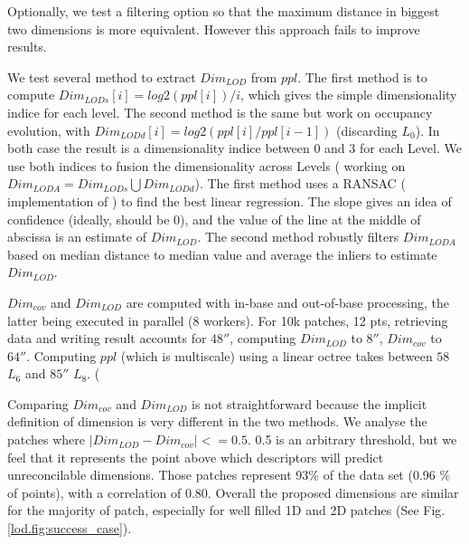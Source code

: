 		Optionally, we test a filtering option so that the maximum distance in biggest two dimensions is more equivalent. However this approach fails to improve results.
		
		We test several method to extract $Dim_{LOD}$ from $ppl$.
		The first method is to compute $ Dim_{LODs}[i] = log2(ppl[i])/i$,
		which gives the simple dimensionality indice for each level.
		The second method is the same but work on occupancy evolution, with
		$Dim_{LODd}[i] = log2(ppl[i]/ppl[i-1])$ (discarding $L_0$).
		In both case the result is a dimensionality indice between 0 and 3 for each Level.
		We use both indices to fusion the dimensionality across Levels (  working on $Dim_{LODA} = Dim_{LODs}\bigcup Dim_{LODd}$).
		The first method uses a RANSAC (\cite{SciPy2014} implementation of \cite{Choi2009}) 
		to find the best linear regression. The slope gives an idea of confidence (ideally, should be 0),
		and the value of the line at the middle of abscissa is an estimate of $Dim_{LOD}$.
		The second method robustly filters $Dim_{LODA}$ based on median distance to median value and
		average the inliers to estimate $Dim_{LOD}$.
		
		$Dim_{cov}$ and $Dim_{LOD}$ are computed with in-base and out-of-base processing, the latter 
		being executed in parallel (8 workers).
		For 10k patches, 12 \mega pts, retrieving data and writing result accounts for $48\second$, computing $Dim_{LOD}$ to $8\second$, $Dim_{cov}$ to $64\second$. Computing $ppl$ (which is multiscale) using a linear octree takes between $58$ $L_6$ and $85 \second$ $L_8$.
		 (
		
		
		Comparing $Dim_{cov}$ and $Dim_{LOD}$ is not straightforward because the implicit definition of dimension is very different in the two methods.
		We analyse the patches where $\lvert Dim_{LOD} -  Dim_{cov}\rvert <=0.5$. 
		0.5 is an arbitrary threshold,
		but we feel that it represents the point above which descriptors will predict unreconcilable dimensions.
		Those patches represent 93\% of the data set (0.96 \% of points), with a correlation of 0.80.
		Overall the proposed dimensions are similar for the majority of patch, especially for well filled 1D and 2D patches (See Fig. \ref{lod.fig:success_case}).
		
